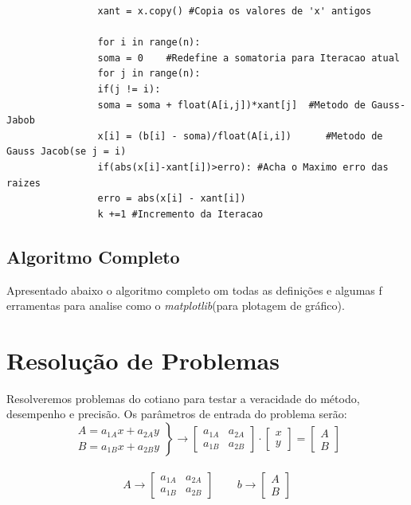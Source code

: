 \documentclass[
12pt,				%
openright,			%
twoside,			%
a4paper,			%
english,			%
french,				%
spanish,			%
brazil				%
]{abntex2_new}
\begin{document}
\begin{alineas}
{\begin{lstlisting}
				xant = x.copy() #Copia os valores de 'x' antigos
				
				for i in range(n):
				soma = 0	#Redefine a somatoria para Iteracao atual
				for j in range(n):
				if(j != i):
				soma = soma + float(A[i,j])*xant[j]  #Metodo de Gauss-Jabob
				x[i] = (b[i] - soma)/float(A[i,i])		#Metodo de Gauss Jacob(se j = i)
				if(abs(x[i]-xant[i])>erro):	#Acha o Maximo erro das raizes
				erro = abs(x[i] - xant[i])
				k +=1 #Incremento da Iteracao
				\end{lstlisting}
				
			}	
		\end{alineas}
		
		\section{Algoritmo Completo}
		Apresentado abaixo o algoritmo completo om todas as definições e algumas f
		erramentas para analise como o \textit{matplotlib}(para plotagem de gráfico).
		
		
		\chapter{Resolução de Problemas}
		Resolveremos problemas do cotiano para testar a veracidade do método, desempenho
		e
		precisão. Os parâmetros de entrada do problema serão:\\
		$$\left.\begin{aligned}
		A=a_{1A} x + a_{2A} y\\
		B=a_{1B} x + a_{2B} y
		\end{aligned}
		\right\} \rightarrow
		\begin{bmatrix}
		a_{1A} & a_{2A} \\
		a_{1B} & a_{2B}
		\end{bmatrix} \cdot
		\begin{bmatrix}
		x \\
		y
		\end{bmatrix}
		= 
		\begin{bmatrix}
		A \\
		B
		\end{bmatrix}
		$$\\
		$$	A \rightarrow   \begin{bmatrix}
		a_{1A} & a_{2A} \\
		a_{1B} & a_{2B}
		\end{bmatrix} \hspace{25pt}
		b \rightarrow  \begin{bmatrix}
		A \\
		B
		\end{bmatrix}
		$$\\
		
\end{document}
